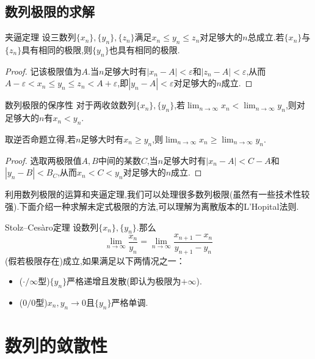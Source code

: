 \subsection{数列极限的求解}

\begin{theorem}{夹逼定理}
	设三数列$\{ x_n \},\{ y_n \},\{ z_n \}$满足$x_n \leq y_n \leq z_n$对足够大的$n$总成立.若$\{ x_n \}$与$\{ z_n \}$具有相同的极限,则$\{ y_n \}$也具有相同的极限.
\end{theorem}
\begin{proof}
	记该极限值为$A$.当$n$足够大时有$|x_n-A|<\varepsilon$和$|z_n-A|<\varepsilon$,从而$A-\varepsilon < x_n \leq y_n \leq z_n < A+\varepsilon$,即$|y_n-A|<\varepsilon$对足够大的$n$成立.
\end{proof}

\begin{theorem}{数列极限的保序性}
	对于两收敛数列$\{ x_n \},\{ y_n \}$,若$\lim_{n \to \infty} x_n < \lim_{n \to \infty} y_n$,则对足够大的$n$有$x_n<y_n$.
\end{theorem}
\begin{remark}
	取逆否命题立得,若$n$足够大时有$x_n \geq y_n$,则$\lim_{n \to \infty} x_n \geq \lim_{n \to \infty} y_n$.
\end{remark}
\begin{proof}
	选取两极限值$A,B$中间的某数$C$,当$n$足够大时有$|x_n-A|<C-A$和$|y_n-B|<B_C$,从而$x_n<C<y_n$对足够大的$n$成立.
\end{proof}

利用数列极限的运算和夹逼定理,我们可以处理很多数列极限(虽然有一些技术性较强).下面介绍一种求解未定式极限的方法,可以理解为离散版本的L'Hopital法则.

\begin{theorem}{Stolz–Cesàro定理}
	设数列$\{ x_n \},\{ y_n \}$.那么$$\lim_{n\to \infty} \frac{x_n}{y_n} = \lim_{n\to \infty} \frac{x_{n+1}-x_n}{y_{n+1}-y_n}$$(假若极限存在)成立,如果满足以下两情况之一：
	\begin{itemize}
		\item ($\cdot / \infty$型)$\{ y_n \}$严格递增且发散(即认为极限为$+\infty$).
		\item ($0/0$型)$x_n,y_n \to 0$且$\{ y_n \}$严格单调.
	\end{itemize}
\end{theorem}

\section{数列的敛散性}

